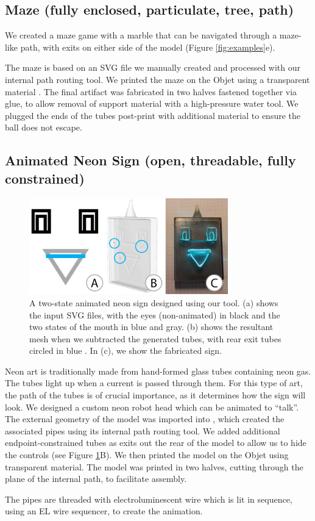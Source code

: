 \subsection{Maze (fully enclosed, particulate, tree, path)}

We created a maze game with a marble that can be navigated through a maze-like path, with exits on either side of the model (Figure \ref{fig:examples}e). 

The maze is based on an SVG file we manually created and processed with our internal path routing tool.  We printed the maze on the Objet using a transparent material . The final artifact was fabricated in two halves fastened together via glue, to allow removal of support material with a high-pressure water tool.  We plugged the ends of the tubes post-print with additional material to ensure the ball does not escape.

\subsection{Animated Neon Sign (open, threadable, fully constrained)}

\begin{figure}[t]
\centering
    \includegraphics[width=3.4in]{figures/sign.png}
\caption{A two-state animated neon sign designed using our tool.  (a) shows the input SVG files, with the eyes (non-animated) in black and the two states of the mouth in {\color{blue}blue} and {\color{gray}gray}.  (b) shows the resultant mesh when we subtracted the generated tubes, with rear exit tubes circled in {\color{blue}blue} . In (c), we show the fabricated sign.}
\label{fig:neon}
\end{figure}

Neon art is traditionally made from hand-formed glass tubes containing neon gas.  The tubes light up when a current is passed through them.  For this type of art, the path of the tubes is of crucial importance, as it determines how the sign will look.  We designed a custom neon robot head which can be animated to ``talk''. 
The external geometry of the model was imported into \systemnamenospace, which created the associated pipes using its internal path routing tool.  We added additional endpoint-constrained tubes as exits out the rear of the model to allow us to hide the controls (see Figure \ref{fig:neon}B).  We then printed the model on the Objet using transparent material. The model was printed in two halves, cutting through the plane of the internal path, to facilitate assembly. 

The pipes are threaded with electroluminescent wire which is lit in sequence, using an EL wire sequencer, to create the animation.